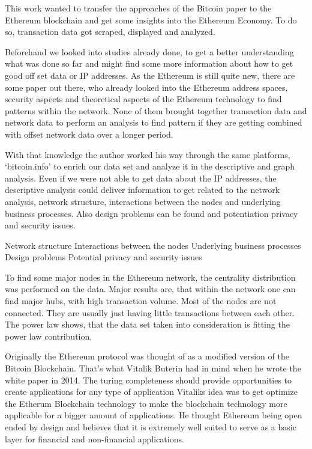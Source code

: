 This work wanted to transfer the approaches of the Bitcoin paper \cite{lischke2016analyzing} to the Ethereum blockchain and get some insights into the Ethereum Economy. To do so, transaction data got scraped, displayed and analyzed. 

Beforehand we looked into studies already done, to get a better understanding what was done so far and might find some more information about how to get good off set data or IP addresses. As the Ethereum is still quite new, there are some paper out there, who already looked into the Ethereum address spaces, security aspects and theoretical aspects of the Ethereum technology to find patterns within the network. None of them brought together transaction data and network data to perform an analysis to find pattern if they are getting combined with offset network data over a longer period.

With that knowledge the author worked his way through the same platforms, ‘bitcoin.info’ to enrich our data set and analyze it in the descriptive and graph analysis. 
Even if we were not able to get data about the IP addresses, the descriptive analysis could deliver information to get related to the network analysis, network structure, interactions between the nodes and underlying business processes. Also design problems can be found and potentiation privacy and security issues. 

Network structure
Interactions between the nodes
Underlying business processes
Design problems
Potential privacy and security issues

To find some major nodes in the Ethereum network, the centrality distribution was performed on the data. Major results are, that within the network one can find major hubs, with high transaction volume. Most of the nodes are not connected. They are usually just having little transactions between each other. The power law shows, that the data set taken into consideration is fitting the power law contribution.

Originally the Ethereum protocol was thought of as a modified version of the Bitcoin Blockchain. That’s what Vitalik Buterin had in mind when he wrote the white paper in 2014. The turing completeness should provide opportunities to create applications for any type of application \cite{vitalikwhite}
Vitaliks idea was to get optimize the Etherum Blockchain technology to make the blockchain technology more applicable for a bigger amount of applications. He thought Ethereum being open ended by design and believes that it is extremely well suited to serve as a basic layer for financial and non-financial applications. \cite{vitalikwhite}

